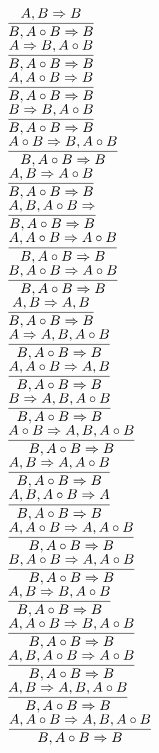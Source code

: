 \documentclass[11pt]{article}
\begin{document}
\begin{center}
\bigskip
\\$\infer{B, A\circ B\Rightarrow B}{A, B\Rightarrow B}$
\bigskip
\\$\infer{B, A\circ B\Rightarrow B}{A\Rightarrow B, A\circ B}$
\bigskip
\\$\infer{B, A\circ B\Rightarrow B}{A, A\circ B\Rightarrow B}$
\bigskip
\\$\infer{B, A\circ B\Rightarrow B}{B\Rightarrow B, A\circ B}$
\bigskip
\\$\infer{B, A\circ B\Rightarrow B}{A\circ B\Rightarrow B, A\circ B}$
\bigskip
\\$\infer{B, A\circ B\Rightarrow B}{A, B\Rightarrow A\circ B}$
\bigskip
\\$\infer{B, A\circ B\Rightarrow B}{A, B, A\circ B\Rightarrow }$
\bigskip
\\$\infer{B, A\circ B\Rightarrow B}{A, A\circ B\Rightarrow A\circ B}$
\bigskip
\\$\infer{B, A\circ B\Rightarrow B}{B, A\circ B\Rightarrow A\circ B}$
\bigskip
\\$\infer{B, A\circ B\Rightarrow B}{A, B\Rightarrow A, B}$
\bigskip
\\$\infer{B, A\circ B\Rightarrow B}{A\Rightarrow A, B, A\circ B}$
\bigskip
\\$\infer{B, A\circ B\Rightarrow B}{A, A\circ B\Rightarrow A, B}$
\bigskip
\\$\infer{B, A\circ B\Rightarrow B}{B\Rightarrow A, B, A\circ B}$
\bigskip
\\$\infer{B, A\circ B\Rightarrow B}{A\circ B\Rightarrow A, B, A\circ B}$
\bigskip
\\$\infer{B, A\circ B\Rightarrow B}{A, B\Rightarrow A, A\circ B}$
\bigskip
\\$\infer{B, A\circ B\Rightarrow B}{A, B, A\circ B\Rightarrow A}$
\bigskip
\\$\infer{B, A\circ B\Rightarrow B}{A, A\circ B\Rightarrow A, A\circ B}$
\bigskip
\\$\infer{B, A\circ B\Rightarrow B}{B, A\circ B\Rightarrow A, A\circ B}$
\bigskip
\\$\infer{B, A\circ B\Rightarrow B}{A, B\Rightarrow B, A\circ B}$
\bigskip
\\$\infer{B, A\circ B\Rightarrow B}{A, A\circ B\Rightarrow B, A\circ B}$
\bigskip
\\$\infer{B, A\circ B\Rightarrow B}{A, B, A\circ B\Rightarrow A\circ B}$
\bigskip
\\$\infer{B, A\circ B\Rightarrow B}{A, B\Rightarrow A, B, A\circ B}$
\bigskip
\\$\infer{B, A\circ B\Rightarrow B}{A, A\circ B\Rightarrow A, B, A\circ B}$

\end{center}
\end{document}
